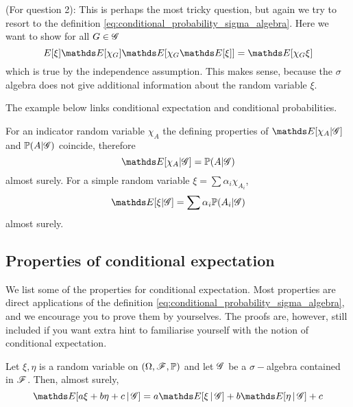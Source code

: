 \begin{solution} (For question 2):
This is perhaps the most tricky question, but again we try to resort to the definition \eqref{eq:conditional_probability_sigma_algebra}. Here we want to show for all $G \in \mathcal{G}$
\begin{equation}
    E[\xi] \E[\chi_G] \E[\chi_G \E[\xi]] = \E[\chi_G \xi]
\end{equation}
which is true by the independence assumption. This makes sense, because the $\sigma$ algebra does not give additional information about the random variable $\xi$.
\end{solution}

The example below links conditional expectation and conditional probabilities.

\begin{example}
For an indicator random variable $\chi_A$ the defining properties of $\E[\chi_A | \G]$ and $\mathbb{P}(A| \mathcal{G})$ coincide, therefore 
\begin{equation}
    \E[\chi_A | \G] = \p(A | \G)
\end{equation}
almost surely. For a simple random variable $\xi = \sum \alpha_i \chi_{A_i}$,
\begin{equation}
    \E[\xi | \G] = \sum \alpha_i \p(A_i | \G)
\end{equation}
almost surely.
\end{example}

\subsection{Properties of conditional expectation}
We list some of the properties for conditional expectation. Most properties are direct applications of the definition \eqref{eq:conditional_probability_sigma_algebra}, and we encourage you to prove them by yourselves. The proofs are, however, still included if you want extra hint to familiarise yourself with the notion of conditional expectation.

\begin{property}[I. Linearity] 
Let $\xi,\eta$ is a random variable on $(\Omega, \mathcal{F}, \mathbb{P})$ and let $\mathcal{G}$ be a $\sigma-$algebra contained in $\mathcal{F}$. Then, almost surely,
\begin{equation} \label{eq:linearity_conditional_expectation}
    \E[a\xi + b\eta + c \,|\, \G] = a\E[\xi \,|\, \G] + b \E[\eta \,|\, \G ] + c
\end{equation}
\end{property}

